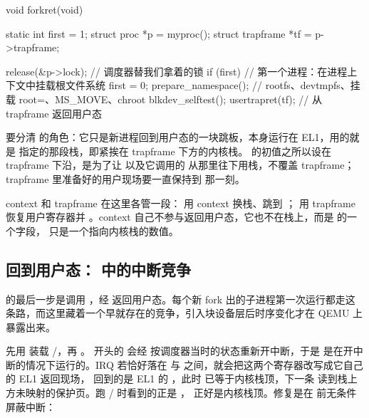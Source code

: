\begin{ccode}
void forkret(void)
{
  static int first = 1;
  struct proc *p = myproc();
  struct trapframe *tf = p->trapframe;

  release(&p->lock);            // 调度器替我们拿着的锁
  if (first) {                  // 第一个进程：在进程上下文中挂载根文件系统
    first = 0;
    prepare_namespace();        // rootfs、devtmpfs、挂载 root=、MS_MOVE、chroot
    blkdev_selftest();
  }
  usertrapret(tf);              // 从 trapframe 返回用户态
}
\end{ccode}

要分清  的角色：它只是新进程回到用户态的一块跳板，本身运行在 EL1，用的就是  指定的那段栈，即紧挨在 trapframe 下方的内核栈。 的初值之所以设在 trapframe 下沿，是为了让  以及它调用的  从那里往下用栈，不覆盖 trapframe；trapframe 里准备好的用户现场要一直保持到  那一刻。

context 和 trapframe 在这里各管一段： 用 context 换栈、跳到 ； 用 trapframe 恢复用户寄存器并 。context 自己不参与返回用户态，它也不在栈上，而是  的一个字段， 只是一个指向内核栈的数值。

\subsection{回到用户态： 中的中断竞争}

 的最后一步是调用 ，经  返回用户态。每个新 fork 出的子进程第一次运行都走这条路，而这里藏着一个早就存在的竞争，引入块设备层后时序变化才在 QEMU 上暴露出来。

 先用  装载 /，再 。 开头的  会经  按调度器当时的状态重新开中断，于是  是在开中断的情况下运行的。IRQ 若恰好落在  与  之间，就会把这两个寄存器改写成它自己的 EL1 返回现场， 回到的是 EL1 的 ，此时  已等于内核栈顶，下一条  读到栈上方未映射的保护页。跑 / 时看到的正是 ， 正好是内核栈顶。修复是在  前无条件屏蔽中断：


